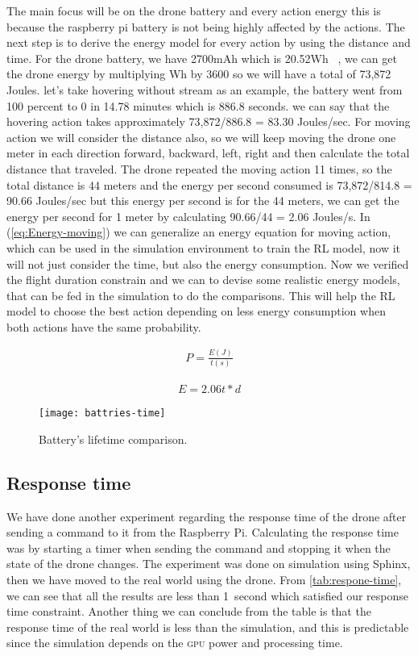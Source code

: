 \documentclass[../main.tex]{subfiles}
\begin{document}
The main focus will be on the drone battery and every 
action energy this is because the raspberry pi battery 
is not being highly affected by the actions. 
The next step is to derive the energy model for every 
action by using the distance and time. For the drone battery, 
we have 2700mAh which is 20.52Wh ~\cite{Par19}, 
we can get the drone energy by multiplying Wh by 3600 
so we will have a total of 73,872 Joules. let's take 
hovering without stream as an example, the battery 
went from 100 percent to 0 in 14.78 minutes which is 
886.8 seconds. we can say that the hovering action takes approximately 73,872/886.8 = 83.30 Joules/sec. For moving action 
we will consider the distance also, so we will keep 
moving the drone one meter in each direction 
{forward, backward, left, right} and then calculate 
the total distance that traveled. The drone repeated 
the moving action 11 times, so the total distance 
is 44 meters and the energy per second consumed 
is 73,872/814.8 = 90.66 Joules/sec but this energy 
per second is for the 44 meters, we can get the 
energy per second for 1 meter by calculating 
90.66/44 = 2.06 Joules/s. 
In (\ref{eq:Energy-moving}) we can generalize an energy equation for moving action, which can be used in the simulation environment to train the RL model, now it will not just consider the time, but also the energy consumption.
Now we verified the flight duration constrain and we can to devise some 
realistic energy models, that can be fed in the simulation to do the comparisons. This will help the RL model to choose 
the best action depending on less energy consumption 
when both actions have the same probability. 

\begin{align}
	P = \frac{E(J)}{t(s)} 
	\label{eq:power}
\end{align}

\begin{align}
	E = 2.06t*d
	\label{eq:Energy-moving}
\end{align}

\begin{figure}[!t]
	\centering
	\texttt{[image: battries-time]}
	\caption{Battery's lifetime comparison.}
	\label{fig:time-comparison}
\end{figure}

\subsection{Response time}

We have done another experiment regarding the response time 
of the drone after sending a command to it from the Raspberry Pi. 
Calculating the response time was by starting a timer when 
sending the command and stopping it when the 
state of the drone changes. 
The experiment was done on simulation using Sphinx,
then we have moved to the real world using the \anafi drone.
From \cref{tab:respone-time}, 
we can see that all the results are less than \SI{1}{second}
which satisfied our response time constraint.
Another thing we can conclude from the table is that 
the response time of the real world is less than 
the simulation, and this is predictable since the simulation
depends on the \textsc{gpu} power and processing time. 
\end{document}
